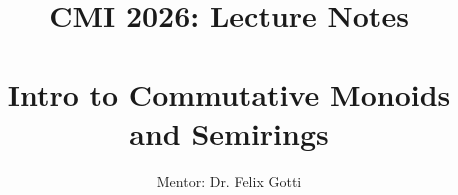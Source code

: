 \documentclass[11pt]{amsart}
\title{CMI 2026: Lecture Notes \\ \phantom{blank} \\ Intro to Commutative Monoids and Semirings}
\author{Mentor: Dr. Felix Gotti}
\begin{document}
\maketitle
\def\ISBLUEPRINT{1}

\end{document}
